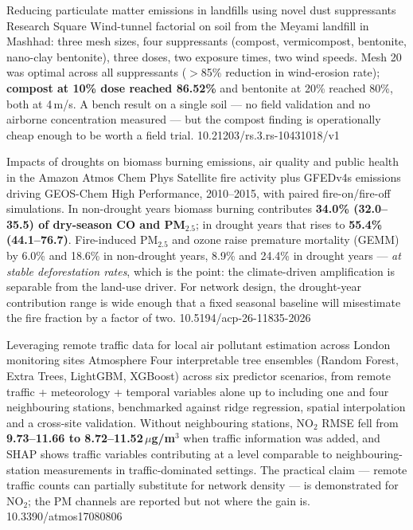 \documentclass[10pt]{article}
\begin{document}
{Reducing particulate matter emissions in landfills using novel dust suppressants}
{Research Square}
{Wind-tunnel factorial on soil from the Meyami landfill in Mashhad: three mesh sizes,
four suppressants (compost, vermicompost, bentonite, nano-clay bentonite), three doses,
two exposure times, two wind speeds. Mesh 20 was optimal across all suppressants
($>$85\% reduction in wind-erosion rate); \textbf{compost at 10\% dose reached 86.52\%}
and bentonite at 20\% reached 80\%, both at 4\,m/s. A bench result on a single soil ---
no field validation and no airborne concentration measured --- but the compost finding is
operationally cheap enough to be worth a field trial.}
{10.21203/rs.3.rs-10431018/v1}

\clearpage


{Impacts of droughts on biomass burning emissions, air quality and public health in the Amazon}
{Atmos Chem Phys}
{Satellite fire activity plus GFEDv4s emissions driving GEOS-Chem High Performance,
2010--2015, with paired fire-on/fire-off simulations. In non-drought years biomass
burning contributes \textbf{34.0\% (32.0--35.5) of dry-season CO and PM$_{2.5}$}; in
drought years that rises to \textbf{55.4\% (44.1--76.7)}. Fire-induced PM$_{2.5}$ and
ozone raise premature mortality (GEMM) by 6.0\% and 18.6\% in non-drought years, 8.9\%
and 24.4\% in drought years --- \emph{at stable deforestation rates}, which is the point:
the climate-driven amplification is separable from the land-use driver. For network
design, the drought-year contribution range is wide enough that a fixed seasonal
baseline will misestimate the fire fraction by a factor of two.}
{10.5194/acp-26-11835-2026}

{Leveraging remote traffic data for local air pollutant estimation across London monitoring sites}
{Atmosphere}
{Four interpretable tree ensembles (Random Forest, Extra Trees, LightGBM, XGBoost)
across six predictor scenarios, from remote traffic + meteorology + temporal variables
alone up to including one and four neighbouring stations, benchmarked against ridge
regression, spatial interpolation and a cross-site validation. Without neighbouring
stations, NO$_2$ RMSE fell from \textbf{9.73--11.66 to 8.72--11.52\,$\mu$g/m$^3$} when
traffic information was added, and SHAP shows traffic variables contributing at a level
comparable to neighbouring-station measurements in traffic-dominated settings. The
practical claim --- remote traffic counts can partially substitute for network density ---
is demonstrated for NO$_2$; the PM channels are reported but not where the gain is.}
{10.3390/atmos17080806}
\end{document}
